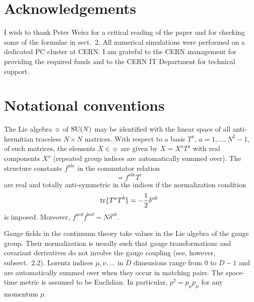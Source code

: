 \section*{Acknowledgements}
I wish to thank Peter Weisz for a critical reading
of the paper and for checking some of the formulae in sect.~2.
All numerical simulations were performed on a
dedicated PC cluster at CERN. I am grateful
to the CERN management for providing the required funds
and to the CERN IT Department for technical support.

\appendix

\section{Notational conventions}\label{app:A}

The Lie algebra $\sun$ of $\mathrm{SU}(N)$
may be identified with the linear space of all anti-hermitian
traceless $N\times N$ matrices.
With respect to a
basis $T^a$, $a=1,\ldots,N^2-1$, of such matrices,
the elements $X\in\sun$ are given by
$X=X^aT^a$ with real components $X^a$
(repeated group indices are automatically summed over).
The structure constants $f^{abc}$ in
the commutator relation
\begin{equation}
  [T^a,T^b]=f^{abc}T^c
  \label{eq:commutator}
\end{equation}
are real and totally anti-symmetric in the indices if
the normalization condition
\begin{equation}
  \mathrm{tr}\{T^aT^b\}=-\frac{1}{2}\delta^{ab}
  \label{eq:normalization}
\end{equation}
is imposed.
Moreover, $f^{acd}f^{bcd}=N\delta^{ab}$.

Gauge fields in the continuum theory
take values in the Lie algebra of the gauge group.
Their
normalization is usually such that
gauge transformations and covariant derivatives
do not involve the gauge coupling
(see, however, subsect.~2.2).
Lorentz indices $\mu,\nu,\ldots$ in $D$ dimensions
range from $0$ to $D-1$ and are automatically
summed over when they occur in matching pairs.
The space-time metric is assumed to be Euclidian. In particular,
$p^2=p_{\mu}p_{\mu}$ for any momentum $p$.

